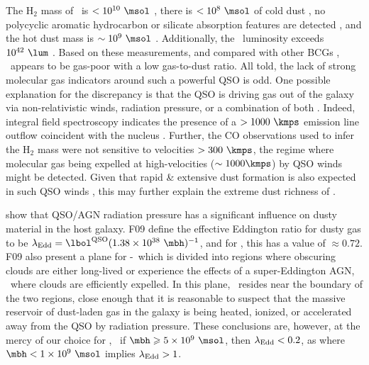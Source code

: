\documentclass[useAMS,usenatbib]{mn2e}
\begin{document}
The H$_2$ mass of \irs\ is $< 10^{10} ~\msol$
\citep{1998ApJ...506..205E}, there is $< 10^8 ~\msol$ of cold dust
\citep{2001MNRAS.326.1467D}, no polycyclic aromatic hydrocarbon or
silicate absorption features are detected \citep{2004ApJ...613..986P,
  2008ApJ...683..114S}, and the hot dust mass is $\sim 10^9 ~\msol$
\citep{1997A&A...318L...1T}. Additionally, the \halpha\ luminosity
exceeds $10^{42} ~\lum$ \citep{1996MNRAS.283.1003C,
  1998ApJ...506..205E}. Based on these measurements, and compared with
other BCGs \citep[\eg][]{2001MNRAS.328..762E}, \irs\ appears to be
gas-poor with a low gas-to-dust ratio. All told, the lack of strong
molecular gas indicators around such a powerful QSO is odd. One
possible explanation for the discrepancy is that the QSO is driving
gas out of the galaxy via non-relativistic winds, radiation pressure,
or a combination of both \citep[\eg][]{2010MNRAS.401....7H}. Indeed,
integral field spectroscopy indicates the presence of a $> 1000
~\kmps$ emission line outflow coincident with the nucleus
\citep{1996MNRAS.283.1003C}. Further, the CO observations used to
infer the H$_2$ mass \citep{1998ApJ...506..205E} were not sensitive to
velocities $> 300 ~\kmps$, the regime where molecular gas being
expelled at high-velocities ($\sim 1000 \kmps$) by QSO winds might be
detected.  Given that rapid \& extensive dust formation is also
expected in such QSO winds \citep{2002ApJ...567L.107E}, this may
further explain the extreme dust richness of \irs.

\citet[][hereafter F09]{2009MNRAS.394L..89F} show that QSO/AGN
radiation pressure has a significant influence on dusty material in
the host galaxy. F09 define the effective Eddington ratio for dusty
gas to be $\leff = \lqso (1.38 \times 10^{38} ~\mbh)^{-1}$, and for
\irs, this has a value of $\approx 0.72$. F09 also present a plane for
\nhobs-\leff\ which is divided into regions where obscuring clouds are
either long-lived or experience the effects of a super-Eddington AGN,
\ie\ where clouds are efficiently expelled. In this plane,
\irs\ resides near the boundary of the two regions, close enough that
it is reasonable to suspect that the massive reservoir of dust-laden
gas in the galaxy is being heated, ionized, or accelerated away from
the QSO by radiation pressure. These conclusions are, however, at the
mercy of our choice for \mbh, \ie\ if $\mbh \ge 5 \times 10^9 ~\msol$,
then $\lambda_{\mathrm{Edd}} < 0.2$, as where $\mbh < 1 \times 10^9 ~\msol$ implies
$\lambda_{\mathrm{Edd}} > 1$.
\end{document}
